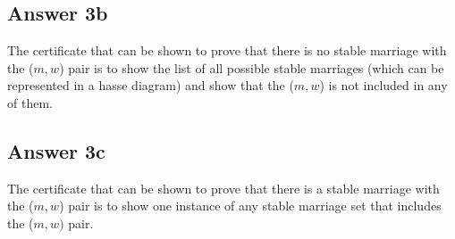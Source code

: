 \documentclass[twoside]{article}
\begin{document}
\subsection{Answer 3b}

The certificate that can be shown to prove that there is no stable marriage with the ($m, w$) pair is to show the list of all possible stable marriages (which can be represented in a hasse diagram) and show that the ($m, w$) is not included in any of them.  

\subsection{Answer 3c}

The certificate that can be shown to prove that there is a stable marriage with the ($m, w$) pair is to show one instance of any stable marriage set that includes the ($m, w)$ pair. 
\end{document}
